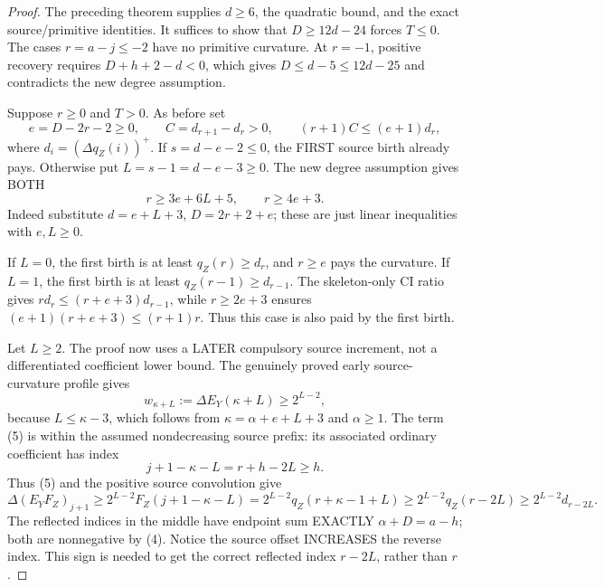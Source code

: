 \begin{proof}
The preceding theorem supplies $d\ge6$, the quadratic bound,
and the exact source/primitive identities. It suffices to show
that $D\ge12d-24$ forces $T\le0$.
The cases $r=a-j\le-2$ have no primitive curvature.
At $r=-1$, positive recovery requires $D+h+2-d<0$, which gives
$D\le d-5\le12d-25$ and contradicts the new degree assumption.

Suppose $r\ge0$ and $T>0$. As before set
\[
 e=D-2r-2\ge0,\qquad C=d_{r+1}-d_r>0,\qquad
 (r+1)C\le(e+1)d_r,
\]
where $d_i=(\Delta q_Z(i))^+$. If $s=d-e-2\le0$, the
FIRST source birth already pays. Otherwise put $L=s-1=d-e-3\ge0$.
The new degree assumption gives BOTH
\[
                  r\ge3e+6L+5,\qquad r\ge4e+3.       \tag{4}
\]
Indeed substitute $d=e+L+3$, $D=2r+2+e$; these are just
linear inequalities with $e,L\ge0$.

If $L=0$, the first birth is at least $q_Z(r)\ge d_r$, and
$r\ge e$ pays the curvature.
If $L=1$, the first birth is at least $q_Z(r-1)\ge d_{r-1}$.
The skeleton-only CI ratio gives
$r d_r\le(r+e+3)d_{r-1}$, while $r\ge2e+3$ ensures
$(e+1)(r+e+3)\le(r+1)r$.
Thus this case is also paid by the first birth.

Let $L\ge2$. The proof now uses a LATER compulsory source increment,
not a differentiated coefficient lower bound. The genuinely proved
early source-curvature profile gives
\[
       w_{\kappa+L}:=\Delta E_Y(\kappa+L)\ge2^{L-2},     \tag{5}
\]
because $L\le\kappa-3$, which follows from
$\kappa=\alpha+e+L+3$ and $\alpha\ge1$.
The term (5) is within the assumed nondecreasing source prefix:
its associated ordinary coefficient has index
\[
                 j+1-\kappa-L=r+h-2L\ge h.
\]
Thus (5) and the positive source convolution give
\[
 \Delta(E_YF_Z)_{j+1}\ge2^{L-2}F_Z(j+1-\kappa-L)
     =2^{L-2}q_Z(r+\kappa-1+L)
     \ge2^{L-2}q_Z(r-2L)
     \ge2^{L-2}d_{r-2L}.                              \tag{6}
\]
The reflected indices in the middle have endpoint sum EXACTLY
$\alpha+D=a-h$; both are nonnegative by (4). Notice the source
offset INCREASES the reverse index. This sign is needed to get
the correct reflected index $r-2L$, rather than $r$.


\end{proof}
